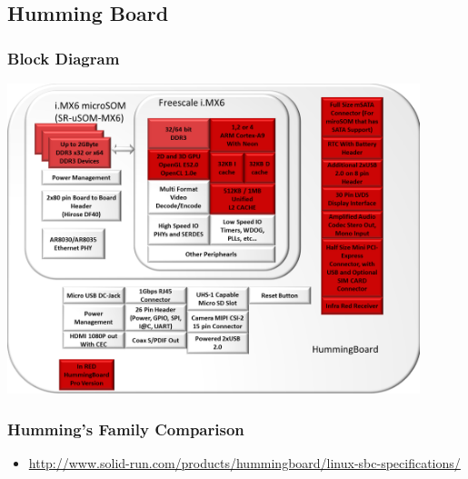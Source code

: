 \subsection{Humming Board}

\begin{frame}
  \frametitle{Block Diagram}
  \begin{center}
    \includegraphics[width=0.9\textwidth]{slides/imx6-humming-board/HummingBoardBlockDiagram.png}\\
  \end{center}
\end{frame}

\begin{frame}
  \frametitle{Humming's Family Comparison}
  \begin{itemize}
  \item
  \url{http://www.solid-run.com/products/hummingboard/linux-sbc-specifications/}
  \end{itemize}
\end{frame}
